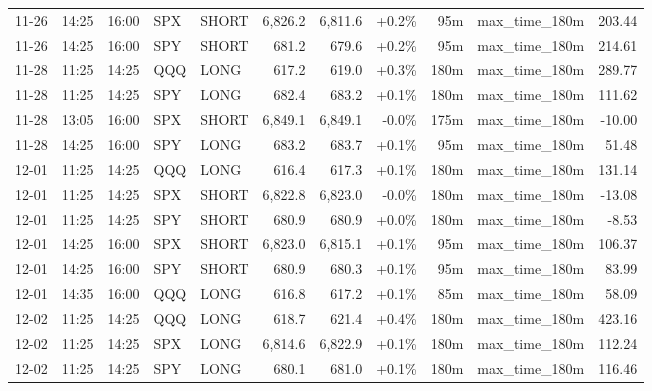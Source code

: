 \documentclass[11pt,a4paper,twoside]{article}
\begin{document}
\begin{center}
\begin{longtable}{>{\color{txtmain}}l l l l l r r r r >{\color{txtmain}}l r}
11-26 & 14:25 & 16:00 & SPX & SHORT & 6,826.2 & 6,811.6 & \textcolor{wingreen}{+0.2\%} & 95m & max\_time\_180m & \textcolor{wingreen}{203.44} \\
11-26 & 14:25 & 16:00 & SPY & SHORT & 681.2 & 679.6 & \textcolor{wingreen}{+0.2\%} & 95m & max\_time\_180m & \textcolor{wingreen}{214.61} \\
11-28 & 11:25 & 14:25 & QQQ & LONG & 617.2 & 619.0 & \textcolor{wingreen}{+0.3\%} & 180m & max\_time\_180m & \textcolor{wingreen}{289.77} \\
11-28 & 11:25 & 14:25 & SPY & LONG & 682.4 & 683.2 & \textcolor{wingreen}{+0.1\%} & 180m & max\_time\_180m & \textcolor{wingreen}{111.62} \\
11-28 & 13:05 & 16:00 & SPX & SHORT & 6,849.1 & 6,849.1 & \textcolor{wingreen}{-0.0\%} & 175m & max\_time\_180m & \textcolor{lossred}{-10.00} \\
11-28 & 14:25 & 16:00 & SPY & LONG & 683.2 & 683.7 & \textcolor{wingreen}{+0.1\%} & 95m & max\_time\_180m & \textcolor{wingreen}{51.48} \\
12-01 & 11:25 & 14:25 & QQQ & LONG & 616.4 & 617.3 & \textcolor{wingreen}{+0.1\%} & 180m & max\_time\_180m & \textcolor{wingreen}{131.14} \\
12-01 & 11:25 & 14:25 & SPX & SHORT & 6,822.8 & 6,823.0 & \textcolor{lossred}{-0.0\%} & 180m & max\_time\_180m & \textcolor{lossred}{-13.08} \\
12-01 & 11:25 & 14:25 & SPY & SHORT & 680.9 & 680.9 & \textcolor{wingreen}{+0.0\%} & 180m & max\_time\_180m & \textcolor{lossred}{-8.53} \\
12-01 & 14:25 & 16:00 & SPX & SHORT & 6,823.0 & 6,815.1 & \textcolor{wingreen}{+0.1\%} & 95m & max\_time\_180m & \textcolor{wingreen}{106.37} \\
12-01 & 14:25 & 16:00 & SPY & SHORT & 680.9 & 680.3 & \textcolor{wingreen}{+0.1\%} & 95m & max\_time\_180m & \textcolor{wingreen}{83.99} \\
12-01 & 14:35 & 16:00 & QQQ & LONG & 616.8 & 617.2 & \textcolor{wingreen}{+0.1\%} & 85m & max\_time\_180m & \textcolor{wingreen}{58.09} \\
12-02 & 11:25 & 14:25 & QQQ & LONG & 618.7 & 621.4 & \textcolor{wingreen}{+0.4\%} & 180m & max\_time\_180m & \textcolor{wingreen}{423.16} \\
12-02 & 11:25 & 14:25 & SPX & LONG & 6,814.6 & 6,822.9 & \textcolor{wingreen}{+0.1\%} & 180m & max\_time\_180m & \textcolor{wingreen}{112.24} \\
12-02 & 11:25 & 14:25 & SPY & LONG & 680.1 & 681.0 & \textcolor{wingreen}{+0.1\%} & 180m & max\_time\_180m & \textcolor{wingreen}{116.46} \\

\end{longtable}
\end{center}
\end{document}
